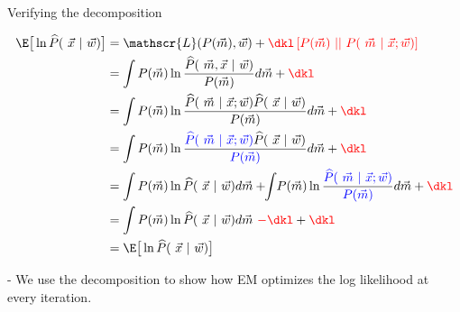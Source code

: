 \begin{frame}{Verifying the decomposition}


\begingroup
\small
\begin{align}
\E
\big\lbrack
\ln \widehat{P}(~\vec x ~|~ \vec w)
\big\rbrack
&= 
\mathscr{L}(P(\vec m), \vec w) + {\color{red}\dkl \left\lbrack P(\vec m) ~||~ P(~\vec m~|~ \vec x; \vec w) \right\rbrack}\\
&= 
\int P(\vec m) \ln \frac{\widehat{P}(~\vec m, \vec x ~|~ \vec w)}{P(\vec m)} d\vec m
+ 
{\color{red}\dkl}\\
&= 
\int P(\vec m) \ln \frac{\widehat{P}(~\vec m ~|~ \vec x ; \vec w) \widehat{P}(~\vec x ~|~ \vec w)}{P(\vec m)} d\vec m
+ 
{\color{red}\dkl}\\
&= 
\int P(\vec m) \ln \frac{{\color{blue}\widehat{P}(~\vec m ~|~ \vec x ; \vec w)} \widehat{P}(~\vec x ~|~ \vec w)}{{\color{blue}P(\vec m)}} d\vec m
+
{\color{red}\dkl}\\
&= 
\int P(\vec m) \ln \widehat{P}(~\vec x ~|~ \vec w) d\vec m
+\kern-0.7ex
\int \kern-0.5ex P(\vec m) \ln \frac{{\color{blue}\widehat{P}(~\vec m ~|~ \vec x ; \vec w)}}{{\color{blue}P(\vec m)}} d\vec m
+
{\color{red}\dkl}\\
&= 
\int P(\vec m) \ln \widehat{P}(~\vec x ~|~ \vec w) d\vec m
~{\color{red} - \dkl}
+
{\color{red}\dkl}\\
&= \E
\big\lbrack
\ln \widehat{P}(~\vec x ~|~ \vec w)
\big\rbrack
\end{align}
\endgroup

\end{frame}

\begin{frame}{\subsecname}



\pause

- We use the decomposition to show how EM optimizes the log likelihood at every iteration.

\end{frame}

